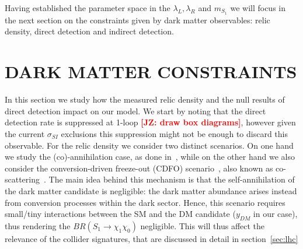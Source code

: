 \documentclass[11pt]{cernrep}
\def\JZ#1{{\bf  \textcolor{red}{[JZ: {#1}]}}}
\begin{document}
Having established the parameter space in the $\lambda_L, \lambda_R$ and $m_{S_1}$ we will focus in the next section on the constraints given by dark matter observables: relic density, direct detection and indirect detection.




\section{DARK MATTER CONSTRAINTS}

In this section we study how the measured relic density and the null results of direct detection impact on our model. We start by noting that the direct detection rate is suppressed at 1-loop \JZ{draw box diagrams}, however given the current $\sigma_{SI}$ exclusions this suppression might not be enough to discard this observable. For the relic density we consider two distinct scenarios. On one hand we study the (co)-annihilation case, as done in~\cite{Baker:2015qna}, while on the other hand we also consider the conversion-driven freeze-out (CDFO) scenario~\cite{Garny:2017rxs}, also known as co-scattering~\cite{DAgnolo:2017dbv}. The main idea behind this mechanism is that the self-annihilation of the dark matter candidate is negligible: the dark matter abundance arises instead from conversion processes within the dark sector. Hence, this scenario requires small/tiny interactions between the SM and the DM candidate ($y_{DM}$ in our case), thus rendering the $BR(S_1 \to \chi_1 \chi_0)$ negligible. This will thus affect the relevance of the collider signatures, that are discussed in detail in section~\ref{sec:lhc}
\end{document}
